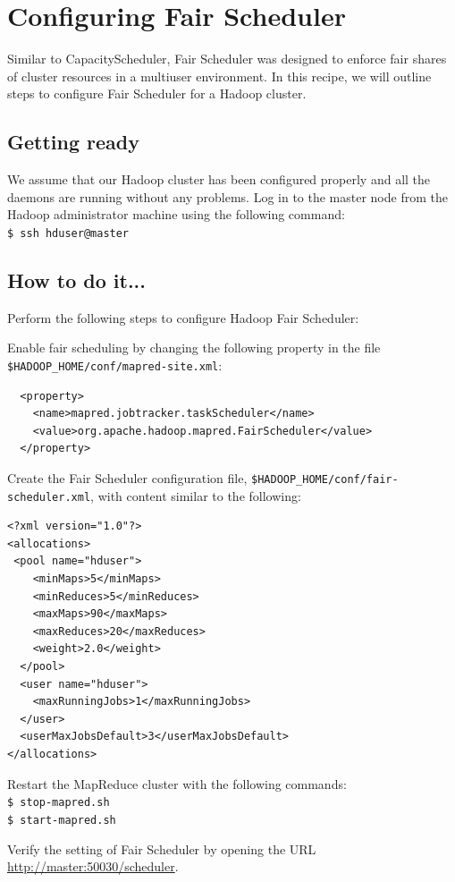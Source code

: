 \section{Configuring Fair Scheduler}
Similar to CapacityScheduler, Fair Scheduler was designed to enforce fair shares of cluster resources in a multiuser environment. In this recipe, we will outline steps to configure Fair Scheduler for a Hadoop cluster.

\subsection*{Getting ready}
We assume that our Hadoop cluster has been configured properly and all the daemons are running without any problems.
Log in to the master node from the Hadoop administrator machine using the following command: \\
\verb|$ ssh hduser@master|

\subsection*{How to do it...}
Perform the following steps to configure Hadoop Fair Scheduler: 

Enable fair scheduling by changing the following property in the file \verb|$HADOOP_HOME/conf/mapred-site.xml|:
\begin{verbatim}
  <property>
    <name>mapred.jobtracker.taskScheduler</name>
    <value>org.apache.hadoop.mapred.FairScheduler</value>
  </property>
\end{verbatim}

Create the Fair Scheduler configuration file, \verb|$HADOOP_HOME/conf/fair-scheduler.xml|, with content similar to the following: 
\begin{verbatim}
<?xml version="1.0"?> 
<allocations>
 <pool name="hduser">
    <minMaps>5</minMaps>
    <minReduces>5</minReduces>
    <maxMaps>90</maxMaps>
    <maxReduces>20</maxReduces>
    <weight>2.0</weight>
  </pool>
  <user name="hduser">
    <maxRunningJobs>1</maxRunningJobs>
  </user>
  <userMaxJobsDefault>3</userMaxJobsDefault>
</allocations>
\end{verbatim}

Restart the MapReduce cluster with the following commands: \\
\verb|$ stop-mapred.sh| \\
\verb|$ start-mapred.sh|

Verify the setting of Fair Scheduler by opening the URL \url{http://master:50030/scheduler}.

